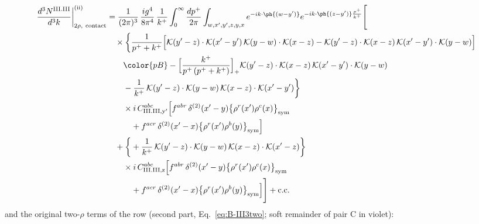 \begin{align}
\frac{d^{3}N^{\rm III.III}}{d^{3}k}\bigg|^{\rm (ii)}_{2\rho,\ {\rm contact}}&=\frac{1}{(2\pi)^{3}}\,\frac{ig^{4}}{8\pi^{4}}\,\frac{1}{k^{+}}\int_{0}^{\infty}\frac{dp^{+}}{2\pi}\int_{w,x',y',z,y,x}e^{-ik\cdot\ph{(w-y')}}e^{-ik\cdot\ph{(z-y')}\frac{p^{+}}{k^{+}}}\Bigg[\notag\\
&\quad\times\bigg\{\frac{1}{p^{+}+k^{+}}\Big[\mathcal{K}(y'-z)\cdot\mathcal{K}(x'-y')\,\mathcal{K}(y-w)\cdot\mathcal{K}(x-z)-\mathcal{K}(y'-z)\cdot\mathcal{K}(x-z)\,\mathcal{K}(x'-y')\cdot\mathcal{K}(y-w)\Big]\notag\\
&\qquad{\color{pB}-\Big[\frac{k^{+}}{p^{+}\,(p^{+}+k^{+})}\Big]_{+}\mathcal{K}(y'-z)\cdot\mathcal{K}(x-z)\,\mathcal{K}(x'-y')\cdot\mathcal{K}(y-w)}\notag\\
&\qquad-\frac{1}{k^{+}}\,\mathcal{K}(y'-z)\cdot\mathcal{K}(y-w)\,\mathcal{K}(x-z)\cdot\mathcal{K}(x'-y')\bigg\}\notag\\
&\qquad\times i\,C^{abc}_{{\rm III.III,y'}}\Big[f^{abr}\,\delta^{(2)}(x'-y)\big\{\rho^{r}(x')\rho^{c}(x)\big\}_{\rm sym}\notag\\
&\qquad\quad +f^{acr}\,\delta^{(2)}(x'-x)\big\{\rho^{r}(x')\rho^{b}(y)\big\}_{\rm sym}\Big]\notag\\
&\quad+\bigg\{+\frac{1}{k^{+}}\,\mathcal{K}(y'-z)\cdot\mathcal{K}(y-w)\,\mathcal{K}(x-z)\cdot\mathcal{K}(x'-z)\bigg\}\notag\\
&\qquad\times i\,C^{abc}_{{\rm III.III,z}}\Big[f^{abr}\,\delta^{(2)}(x'-y)\big\{\rho^{r}(x')\rho^{c}(x)\big\}_{\rm sym}\notag\\
&\qquad\quad +f^{acr}\,\delta^{(2)}(x'-x)\big\{\rho^{r}(x')\rho^{b}(y)\big\}_{\rm sym}\Big]\Bigg]+{\rm c.c.}\label{eq:D-III.III-2}
\end{align}
and the original two-$\rho$ terms of the row (second part, Eq.~\eqref{eq:B-III3two}; soft remainder of pair C in violet):
